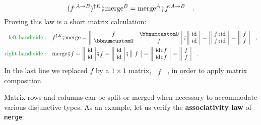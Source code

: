 ~\vspace{-0.3\baselineskip}
\[
(f^{:A\rightarrow B})^{\uparrow E}\bef\text{merge}^{B}=\text{merge}^{A}\bef f^{:A\rightarrow B}\quad.
\]
Proving this law is a short matrix calculation:
\begin{align*}
{\color{greenunder}\text{left-hand side}:}\quad & f^{\uparrow E}\bef\text{merge}=\,\begin{array}{||cc|}
f & \bbnum 0\\
\bbnum 0 & f
\end{array}\,\bef\,\begin{array}{||c|}
\text{id}\\
\text{id}
\end{array}\,=\,\begin{array}{||c|}
f\bef\text{id}\\
f\bef\text{id}
\end{array}\,=\,\begin{array}{||c|}
f\\
f
\end{array}\quad,\\
{\color{greenunder}\text{right-hand side}:}\quad & \text{merge}\bef f=\,\begin{array}{||c|}
\text{id}\\
\text{id}
\end{array}\,\bef\gunderline f=\,\begin{array}{||c|}
\text{id}\\
\text{id}
\end{array}\,\bef\,\begin{array}{||c|}
f\end{array}\,=\,\begin{array}{||c|}
\text{id}\bef f\\
\text{id}\bef f
\end{array}\,=\,\begin{array}{||c|}
f\\
f
\end{array}\quad.
\end{align*}
In the last line we replaced $f$ by a $1\times1$ matrix, $\,\begin{array}{||c|}
f\end{array}$~, in order to apply matrix composition.

Matrix rows and columns can be split or merged when necessary to accommodate
various disjunctive types. As an example, let us verify the \textbf{associativity
law} of \lstinline!merge!:

